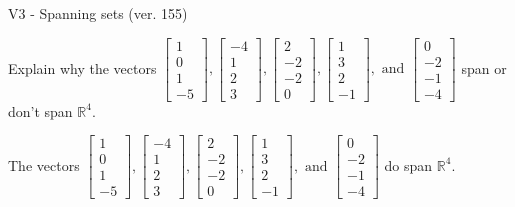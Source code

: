 \begin{exercise}
  \begin{exerciseTitle}V3 - Spanning sets (ver. 155)\end{exerciseTitle}
  \begin{exerciseStatement}
    Explain why the vectors \(\left[\begin{array}{r}
1 \\
0 \\
1 \\
-5
\end{array}\right] , \left[\begin{array}{r}
-4 \\
1 \\
2 \\
3
\end{array}\right] , \left[\begin{array}{r}
2 \\
-2 \\
-2 \\
0
\end{array}\right] , \left[\begin{array}{r}
1 \\
3 \\
2 \\
-1
\end{array}\right] , \text{ and } \left[\begin{array}{r}
0 \\
-2 \\
-1 \\
-4
\end{array}\right]\) span or don't span \(\mathbb{R}^4\). 
	


  \end{exerciseStatement}
  \begin{exerciseAnswer}
   The vectors \(\left[\begin{array}{r}
1 \\
0 \\
1 \\
-5
\end{array}\right] , \left[\begin{array}{r}
-4 \\
1 \\
2 \\
3
\end{array}\right] , \left[\begin{array}{r}
2 \\
-2 \\
-2 \\
0
\end{array}\right] , \left[\begin{array}{r}
1 \\
3 \\
2 \\
-1
\end{array}\right] , \text{ and } \left[\begin{array}{r}
0 \\
-2 \\
-1 \\
-4
\end{array}\right]\) 
  	 do  
	span \(\mathbb{R}^4\).
  



\end{exerciseAnswer}
\end{exercise}
